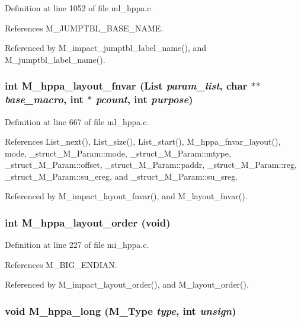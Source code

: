 Definition at line 1052 of file ml\_\-hppa.c.

References M\_\-JUMPTBL\_\-BASE\_\-NAME.

Referenced by M\_\-impact\_\-jumptbl\_\-label\_\-name(), and M\_\-jumptbl\_\-label\_\-name().
\subsubsection{\setlength{\rightskip}{0pt plus 5cm}int M\_\-hppa\_\-layout\_\-fnvar (\bf{List} {\em param\_\-list}, char $\ast$$\ast$ {\em base\_\-macro}, int $\ast$ {\em pcount}, int {\em purpose})}\label{m__hppa_8h_e899f68524e3ef5c4013a8a6bd6d434d}




Definition at line 667 of file ml\_\-hppa.c.

References List\_\-next(), List\_\-size(), List\_\-start(), M\_\-hppa\_\-fnvar\_\-layout(), mode, \_\-struct\_\-M\_\-Param::mode, \_\-struct\_\-M\_\-Param::mtype, \_\-struct\_\-M\_\-Param::offset, \_\-struct\_\-M\_\-Param::paddr, \_\-struct\_\-M\_\-Param::reg, \_\-struct\_\-M\_\-Param::su\_\-ereg, and \_\-struct\_\-M\_\-Param::su\_\-sreg.

Referenced by M\_\-impact\_\-layout\_\-fnvar(), and M\_\-layout\_\-fnvar().
\subsubsection{\setlength{\rightskip}{0pt plus 5cm}int M\_\-hppa\_\-layout\_\-order (void)}\label{m__hppa_8h_49c051dc867ed902e61dfc1094b7de25}




Definition at line 227 of file mi\_\-hppa.c.

References M\_\-BIG\_\-ENDIAN.

Referenced by M\_\-impact\_\-layout\_\-order(), and M\_\-layout\_\-order().
\subsubsection{\setlength{\rightskip}{0pt plus 5cm}void M\_\-hppa\_\-long (\bf{M\_\-Type} {\em type}, int {\em unsign})}\label{m__hppa_8h_27985b8000bb57a9650315ba36193157}




